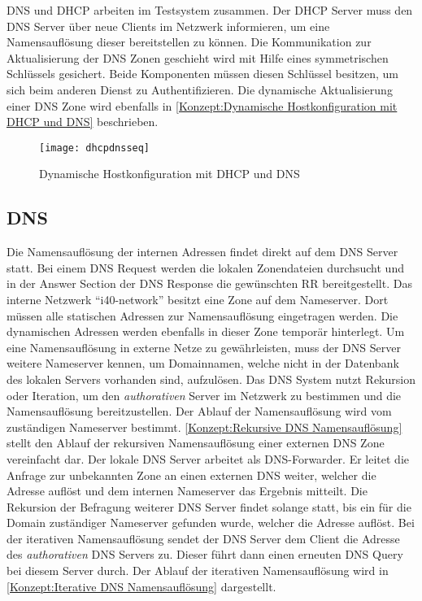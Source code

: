 \ac{DNS} und \ac{DHCP} arbeiten im Testsystem zusammen. Der \ac{DHCP} Server muss den \ac{DNS} Server über neue Clients im Netzwerk informieren, um eine Namensauflösung dieser bereitstellen zu können. Die Kommunikation zur Aktualisierung der \ac{DNS} Zonen geschieht wird mit Hilfe eines symmetrischen Schlüssels gesichert. Beide Komponenten müssen diesen Schlüssel besitzen, um sich beim anderen Dienst zu Authentifizieren. Die dynamische Aktualisierung einer \ac{DNS} Zone wird ebenfalls in \autoref{Konzept:Dynamische Hostkonfiguration mit DHCP und DNS} beschrieben.

\begin{figure}[h]
  \centering
  \texttt{[image: dhcpdnsseq]}
  \caption{Dynamische Hostkonfiguration mit DHCP und DNS} 
  \label{Konzept:Dynamische Hostkonfiguration mit DHCP und DNS}
\end{figure}

\subsection{\ac{DNS}}
Die Namensauflösung der internen Adressen findet direkt auf dem \ac{DNS} Server statt. Bei einem \ac{DNS} Request werden die lokalen Zonendateien durchsucht und in der Answer Section der \ac{DNS} Response die gewünschten \ac{RR} bereitgestellt. Das interne Netzwerk "`i40-network"' besitzt eine Zone auf dem Nameserver. Dort müssen alle statischen Adressen zur Namensauflösung eingetragen werden. Die dynamischen Adressen werden ebenfalls in dieser Zone temporär hinterlegt. Um eine Namensauflösung in externe Netze zu gewährleisten, muss der \ac{DNS} Server weitere Nameserver kennen, um Domainnamen, welche nicht in der Datenbank des lokalen Servers vorhanden sind, aufzulösen. Das \ac{DNS} System nutzt Rekursion oder Iteration, um den \textit{authorativen} Server im Netzwerk zu bestimmen und die Namensauflösung bereitzustellen. Der Ablauf der Namensauflösung wird vom zuständigen Nameserver bestimmt. \autoref{Konzept:Rekursive DNS Namensauflösung} stellt den Ablauf der rekursiven Namensauflösung einer externen \ac{DNS} Zone vereinfacht dar. Der lokale \ac{DNS} Server arbeitet als \ac{DNS}-Forwarder. Er leitet die Anfrage zur unbekannten Zone an einen externen \ac{DNS} weiter, welcher die Adresse auflöst und dem internen Nameserver das Ergebnis mitteilt. Die Rekursion der Befragung weiterer \ac{DNS} Server findet solange statt, bis ein für die Domain zuständiger Nameserver gefunden wurde, welcher die Adresse auflöst. Bei der iterativen Namensauflösung sendet der \ac{DNS} Server dem Client die Adresse des \textit{authorativen} \ac{DNS} Servers zu. Dieser führt dann einen erneuten \ac{DNS} Query bei diesem Server durch. Der Ablauf der iterativen Namensauflösung wird in \autoref{Konzept:Iterative DNS Namensauflösung} dargestellt.

